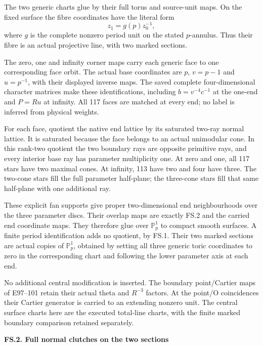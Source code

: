 The two generic charts glue by their full torus
and source-unit maps. On the fixed surface the
fibre coordinates have the literal form
\[
 z_1=g(p)z_0^{-1},                                         \tag{FS.2}
\]
where \(g\) is the complete nonzero period unit
on the stated \(p\)-annulus. Thus their fibre is
an actual projective line, with two marked sections.

The zero, one and infinity corner maps carry each
generic face to one corresponding face orbit.
The actual base coordinates are \(p\), \(v=p-1\)
and \(u=p^{-1}\), with their displayed inverse maps.
The saved complete four-dimensional character
matrices make these identifications, including
\(b=v^{-4}c^{-1}\) at the one-end and \(P=Ru\)
at infinity. All 117 faces are matched at every
end; no label is inferred from physical weights.

For each face, quotient the native end lattice
by its saturated two-ray normal lattice. It is
saturated because the face belongs to an actual
unimodular cone. In this rank-two quotient the
two boundary rays are opposite primitive rays,
and every interior base ray has parameter
multiplicity one. At zero and one, all 117
stars have two maximal cones. At infinity,
113 have two and four have three. The two-cone
stars fill the full parameter half-plane; the
three-cone stars fill that same half-plane
with one additional ray.

These explicit fan supports give proper
two-dimensional end neighbourhoods over the
three parameter discs. Their overlap maps
are exactly FS.2 and the carried end coordinate
maps. They therefore glue over \(\mathbb P^1_p\)
to compact smooth surfaces. A finite period
identification adds no quotient, by FS.1.
Their two marked sections are actual copies
of \(\mathbb P^1_p\), obtained by setting all
three generic toric coordinates to zero
in the corresponding chart and following
the lower parameter axis at each end.

No additional central modification is inserted.
The boundary point/Cartier maps of E97--101
retain their actual theta and \(R^{-3}\)
factors. At the point/O coincidences their
Cartier generator is carried to an extending
nonzero unit. The central surface charts
here are the executed total-line charts,
with the finite marked boundary comparison
retained separately.

\par

\medskip\noindent\textbf{FS.2. Full normal clutches on the two sections}

